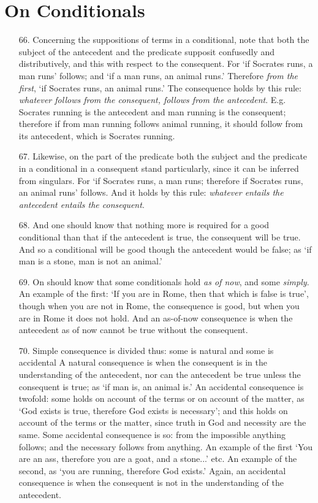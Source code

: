 \documentclass[]{article}
\begin{document}
\section{On Conditionals}
\begin{itemize}
\item[66.] Concerning the suppositions of terms in a conditional, note that both the subject of the antecedent and the predicate supposit confusedly and distributively, and this with respect to the consequent. For `if Socrates runs, a man runs' follows; and `if a man runs, an animal runs.' Therefore \textit{from the first}, `if Socrates runs, an animal runs.' The consequence holds by this rule: \textit{whatever follows from the consequent, follows from the antecedent}. E.g. Socrates running is the antecedent and man running is the consequent; therefore if from man running follows animal running, it should follow from its antecedent, which is Socrates running.
\item[67.] Likewise, on the part of the predicate both the subject and the predicate in a conditional in a consequent stand particularly, since it can be inferred from singulars. For `if Socrates runs, a man runs; therefore if Socrates runs, an animal runs' follows. And it holds by this rule: \textit{whatever entails the antecedent entails the consequent}.
\item[68.] And one should know that nothing more is required for a good conditional than that if the antecedent is true, the consequent will be true. And so a conditional will be good though the antecedent would be false; as `if man is a stone, man is not an animal.'
\item[69.] On should know that some conditionals hold \textit{as of now}, and some \textit{simply}. An example of the first: `If you are in Rome, then that which is false is true', though when you are not in Rome, the consequence is good, but when you are in Rome it does not hold. And an as-of-now consequence is when the antecedent as of now cannot be true without the consequent.
\item[70.] Simple consequence is divided thus: some is natural and some is accidental A natural consequence is when the consequent is in the understanding of the antecedent, nor can the antecedent be true unless the consequent is true; as `if man is, an animal is.' An accidental consequence is twofold: some holds on account of the terms or on account of the matter, as `God exists is true, therefore God exists is necessary'; and this holds on account of the terms or the matter, since truth in God and necessity are the same. Some accidental consequence is so: from the impossible anything follows; and the necessary follows from anything. An example of the first `You are an ass, therefore you are a goat, and a stone...' etc. An example of the second, as `you are running, therefore God exists.' Again, an accidental consequence is when the consequent is not in the understanding of the antecedent.

\end{itemize}
\end{document}
